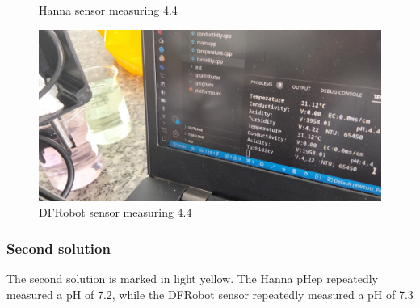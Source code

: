 \begin{figure}[h]
\begin{minipage}[b]{0.2\textwidth}
    \caption{Hanna sensor measuring 4.4}
  \end{minipage}
  \hfill
  \begin{minipage}[b]{0.7\textwidth}
    \includegraphics[width=\textwidth]{sensors/13_ph4_dfrobot.jpg}
    \caption{DFRobot sensor measuring 4.4}
  \end{minipage}
\end{figure}

\subsubsection{Second solution}
The second solution is marked in light yellow. The Hanna pHep repeatedly measured a pH of 7.2, while the DFRobot sensor repeatedly measured a pH of 7.3

